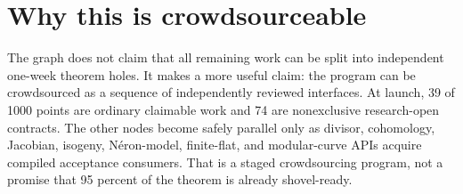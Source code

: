 \section{Why this is crowdsourceable}

The graph does not claim that all remaining work can be split into independent
one-week theorem holes.  It makes a more useful claim: the program can be
crowdsourced as a sequence of independently reviewed interfaces.  At launch,
39 of 1000 points are ordinary claimable work and 74 are nonexclusive
research-open contracts.  The other nodes become safely parallel only as
divisor, cohomology, Jacobian, isogeny, N\'eron-model, finite-flat, and
modular-curve APIs acquire compiled acceptance consumers.  That is a staged
crowdsourcing program, not a promise that 95 percent of the theorem is already
shovel-ready.
